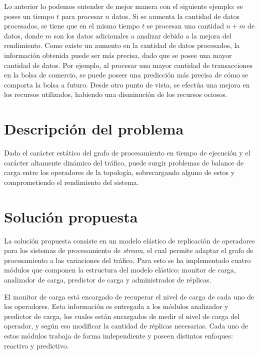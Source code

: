 Lo anterior lo podemos entender de mejor manera con el siguiente ejemplo: se posee un tiempo $t$ para procesar $n$ datos\normalsize{. Si se aumenta} la cantidad de datos procesados, se tiene que en el mismo tiempo $t$ se procesan una cantidad $n+m$ de datos, donde $m$ son los datos adicionales a analizar debido a la mejora del rendimiento. Como existe un aumento en la cantidad de datos procesados, la informaci\'on obtenida puede ser m\'as precisa, dado que se posee una mayor cantidad de datos. Por ejemplo, al procesar una mayor cantidad de transacciones en la bolsa de comercio, se puede poseer una predicci\'on m\'as precisa de c\'omo se comporta la bolsa a futuro. Desde otro punto de vista, se efect\'ua una mejora en los recursos utilizados, habiendo una disminuci\'on de los recursos ociosos.

\section{Descripci\'on del problema}
\label{intro:problema}


Dado el car\'acter est\'atico del grafo de procesamiento en tiempo de ejecuci\'on y el car\'acter altamente din\'amico del tr\'afico, puede surgir problemas de balance de carga entre los operadores de la topolog\'ia, sobrecargando alguno de estos y comprometiendo el rendimiento del sistema.

\section{Soluci\'on propuesta}
\label{intro:solucion}

La soluci\'on propuesta consiste en un modelo el\'astico de replicaci\'on de operadores para los sistemas de procesamiento de \textit{stream}, el cual permite adaptar el grafo de procesamiento a las variaciones del tr\'afico. Para esto se ha implementado cuatro m\'odulos que componen la estructura del modelo el\'astico: monitor de carga, analizador de carga, predictor de carga y administrador de r\'eplicas.

El monitor de carga est\'a encargado de recuperar el nivel de carga de cada uno de los operadores. Esta informaci\'on es entregada a los m\'odulos analizador y predictor de carga, los cuales est\'an encargados de medir el nivel de carga del operador, y seg\'un eso modificar la cantidad de r\'eplicas necesarias. Cada uno de estos m\'odulos trabaja de forma independiente y poseen distintos enfoques: reactivo y predictivo.

